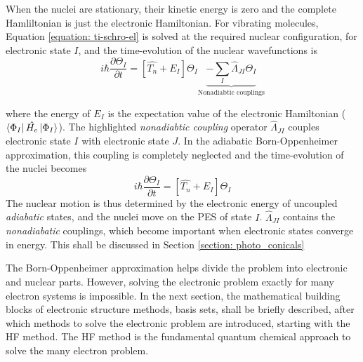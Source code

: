 When the nuclei are stationary, their kinetic energy is zero and the complete Hamliltonian is just the electronic Hamiltonian. For vibrating molecules, Equation \ref{equation: ti-schro-el} is solved at the required nuclear configuration, for electronic state $I$, and the time-evolution of the nuclear wavefunctions is
\begin{equation}\label{equation: nucwavefunctions}
    i\hbar{}\frac{\partial{}\Theta_{I}}{\partial{}t}=[\hat{T_{n}}+E_{I}]\Theta_{I}\underbrace{-\sum_{I}\hat{\Lambda}_{JI}\Theta_{I}}_\text{Nonadiabtic couplings}
\end{equation} 

where the energy of $E_{I}$ is the expectation value of the electronic Hamiltonian ($\bra{\Phi_{I}}\hat{H_e}\ket{\Phi_{I}}$). The highlighted \textit{nonadiabtic coupling} operator $\hat{\Lambda}_{JI}$ couples electronic state $I$ with electronic state $J$. In the adiabatic Born-Oppenheimer approximation, this coupling is completely neglected and the time-evolution of the nuclei becomes
\begin{equation}\label{equation: BO}
    i\hbar{}\frac{\partial{}\Theta_{I}}{\partial{}t}=[\hat{T_{n}}+E_{I}]\Theta_{I}
\end{equation} 
The nuclear motion is thus determined by the electronic energy of uncoupled \textit{adiabatic} states, and the nuclei move on the \ac{PES} of state $I$. $\hat{\Lambda}_{JI}$ contains the \textit{nonadiabatic} couplings, which become important when electronic states converge in energy. This shall be discussed in Section \ref{section: photo_conicals}

The Born-Oppenheimer approximation helps divide the problem into electronic and nuclear parts. However, solving the electronic problem exactly for many electron systems is impossible. In the next section, the mathematical building blocks of electronic structure methods, basis sets, shall be briefly described, after which methods to solve the electronic problem are introduced, starting with the \acf{HF} method. The \ac{HF} method is the fundamental quantum chemical approach to solve the many electron problem.
